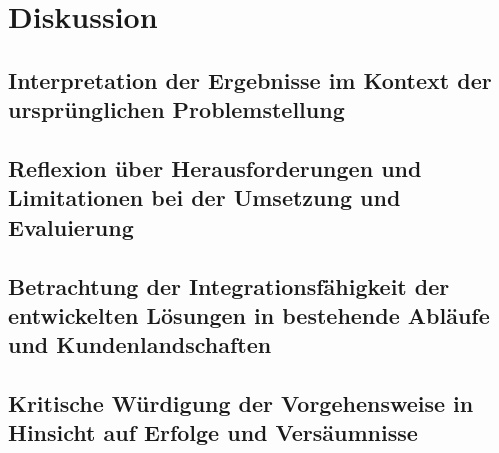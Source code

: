 \chapter{Diskussion}\label{ch:diskussion}

\section{Interpretation der Ergebnisse im Kontext der ursprünglichen Problemstellung}

\section{Reflexion über Herausforderungen und Limitationen bei der Umsetzung und Evaluierung}

\section{Betrachtung der Integrationsfähigkeit der entwickelten Lösungen in bestehende Abläufe und Kundenlandschaften}

\section{Kritische Würdigung der Vorgehensweise in Hinsicht auf Erfolge und Versäumnisse}

